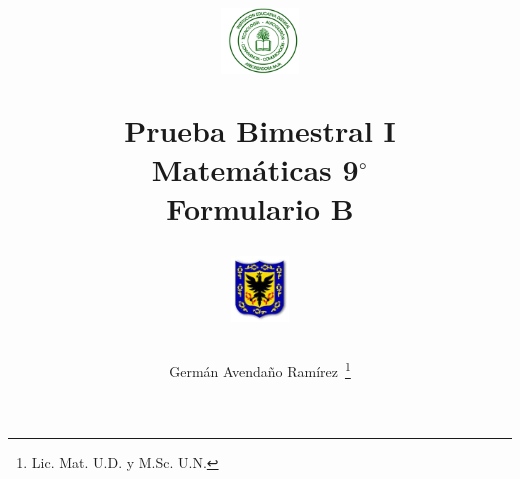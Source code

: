 \documentclass[10pt,letterpaper,addpoints]{exam}
\begin{document}
\title{\begin{minipage}{.2\textwidth}
        \includegraphics[height=1.75cm]{Images/logo-colegio.png}
       \end{minipage}
\begin{minipage}{.55\textwidth}
 \begin{center}
Prueba Bimestral I \\Matemáticas 9$^{\circ}$\\Formulario \textbf{B}
\end{center}
\end{minipage}
\begin{minipage}{.2\textwidth}
\includegraphics[height=1.75cm]{Images/logo-sed.png} 
\end{minipage}
}
\author{Germ\'{a}n Avendaño Ram\'{i}rez~\thanks{Lic. Mat. U.D. y M.Sc. U.N.}}
\date{}
\maketitle
\begin{center}
\end{center}
\vspace{0.2in}
\end{document}
